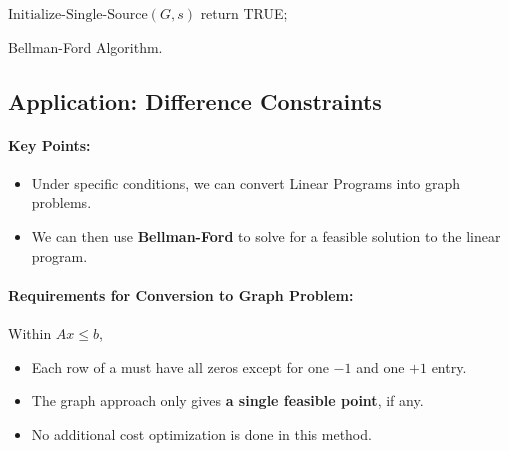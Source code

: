 \documentclass[a4paper,12pt]{report}
\begin{document}
\begin{algorithm}[H]
\SetAlgoLined
{}
	\BlankLine
	\BlankLine
	$\text{Initialize-Single-Source}(G,s)$\;
	return TRUE;
	\caption{Bellman-Ford Algorithm.}
\end{algorithm}


\subsection{Application: Difference Constraints}

\paragraph{Key Points: } 
\begin{itemize}
\item Under specific conditions, we can convert Linear Programs into graph problems. 
\item We can then use \textbf{Bellman-Ford} to solve for a feasible solution to the linear program.
\end{itemize}

\paragraph{Requirements for Conversion to Graph Problem: } Within $Ax \leq b$,
\begin{itemize}
\item Each row of a must have all zeros except for one $-1$ and one $+1$ entry.
\item The graph approach only gives \textbf{a single feasible point}, if any.
\item No additional cost optimization is done in this method.
\end{itemize}
\end{document}
